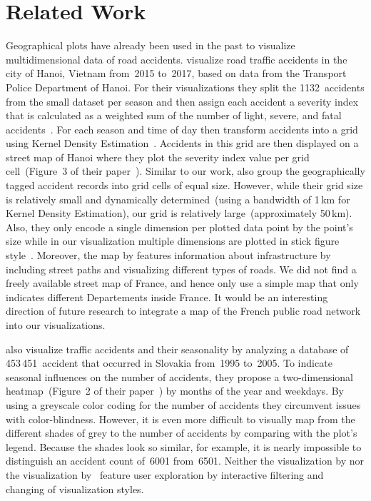 \section{Related Work}
Geographical plots have already been used in the past to visualize multidimensional data of road accidents.
\textcite{LeLL2020} visualize road traffic accidents in the city of Hanoi, Vietnam from~2015 to~2017, based on data from the Transport Police Department of Hanoi.
For their visualizations they split the 1132~accidents from the small dataset per season and then assign each accident a severity index that is calculated as a weighted sum of the number of light, severe, and fatal accidents~\cite{GeurtsWBV2004}.
For each season and time of day \citeauthor{LeLL2020} then transform accidents into a grid using Kernel Density Estimation~\cite{Anderson2009}. Accidents in this grid are then displayed on a street map of Hanoi where they plot the severity index value per grid cell~(Figure~3 of their paper~\cite{LeLL2020}).
Similar to our work, \citeauthor{LeLL2020} also group the geographically tagged accident records into grid cells of equal size. However, while their grid size is relatively small and dynamically determined~(using a bandwidth of 1\,km for Kernel Density Estimation), our grid is relatively large~(approximately 50\,km). Also, they only encode a single dimension per plotted data point by the point's size while in our visualization multiple dimensions are plotted in stick figure style~\cite{PickettG1988}.
Moreover, the map by \citeauthor{LeLL2020} features information about infrastructure by including street paths and visualizing different types of roads. We did not find a freely available street map of France, and hence only use a simple map that only indicates different Departements inside France. It would be an interesting direction of future research to integrate a map of the French public road network into our visualizations.

\textcite{LavravcJTK2008} also visualize traffic accidents and their seasonality by analyzing a database of 453\,451~accident that occurred in Slovakia from~1995 to~2005.
To indicate seasonal influences on the number of accidents, they propose a two-dimensional heatmap~(Figure~2 of their paper~\cite{LavravcJTK2008}) by months of the year and weekdays. By using a greyscale color coding for the number of accidents they circumvent issues with color-blindness. However, it is even more difficult to visually map from the different shades of grey to the number of accidents by comparing with the plot's legend. Because the shades look so similar, for example, it is nearly impossible to distinguish an accident count of~6001 from~6501.
Neither the visualization by \citeauthor{LavravcJTK2008} nor the visualization by~\citeauthor{LeLL2020} feature user exploration by interactive filtering and changing of visualization styles.
